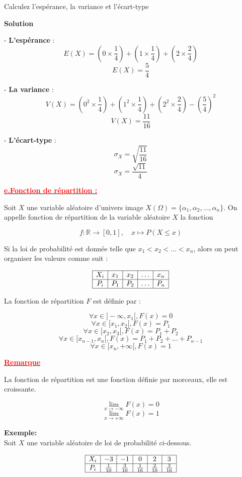 \documentclass[12pt,a4paper]{article}
\begin{document}
 Calculez l'espérance, la variance et l'écart-type

\textbf{Solution}

- \textbf{L'espérance} : 
\[
E(X) = \left(0 \times \frac{1}{4}\right) + \left(1 \times \frac{1}{4}\right) + \left(2 \times \frac{2}{4}\right)
\]
\[
E(X) = \frac{5}{4}
\]

- \textbf{La variance} : 
\[
V(X) = \left(0^2 \times \frac{1}{4}\right) + \left(1^2 \times \frac{1}{4}\right) + \left(2^2 \times \frac{2}{4}\right) - \left(\frac{5}{4}\right)^2
\]
\[
V(X) = \frac{11}{16}
\]

- \textbf{L'écart-type} : 
\[
\sigma_X = \sqrt{\frac{11}{16}} 
\]
\[
\sigma_X = \frac{\sqrt{11}}{4}
\]

\underline{\textbf{\textcolor{red}{e.Fonction de répartition :}}}

Soit \( X \) une variable aléatoire d'univers image \( X(\Omega) = \{ \alpha_1, \alpha_2, \dots, \alpha_n \} \). On appelle fonction de répartition de la variable aléatoire \( X \) la fonction

\[
f : \mathbb{R} \to [0, 1], \quad x \mapsto P(X \leq x)
\]

Si la loi de probabilité est donnée telle que \( x_1 < x_2 < \dots < x_n \), alors on peut organiser les valeurs comme suit :

\[
\begin{array}{|c|c|c|c|c|}
\hline
X_i & x_1 & x_2 & \dots & x_n \\
\hline
P_i & P_1 & P_2 & \dots & P_n \\
\hline
\end{array}
\]

La fonction de répartition \( F \) est définie par :

\[
\forall x \in]-\infty, x_1[, F(x) = 0
\]
\[
\forall x \in [x_1, x_2[, F(x) = P_1
\]
\[
\forall x \in [x_2, x_3[, F(x) = P_1 + P_2
\]
\[
\forall x \in [x_{n-1}, x_n[, F(x) = P_1 + P_2 + \dots + P_{n-1}
\]
\[
\forall x \in [x_n, +\infty[, F(x) = 1
\]


\underline{\textbf{\textcolor{red}{Remarque}}}

La fonction de répartition est une fonction définie par morceaux, elle est croissante.

\[
\lim_{x \to -\infty} F(x) = 0
\]
\[
\lim_{x \to +\infty} F(x) = 1
\]

\textbf{Exemple:} \\
Soit \( X \) une variable aléatoire de loi de probabilité ci-dessous.

\[
\begin{array}{|c|c|c|c|c|c|}
\hline
X_i & -3 & -1 & 0 & 2 & 3 \\
\hline
P_i & \frac{1}{10} & \frac{3}{10} & \frac{1}{16} & \frac{2}{10} & \frac{3}{16} \\
\hline
\end{array}
\]
\end{document}
